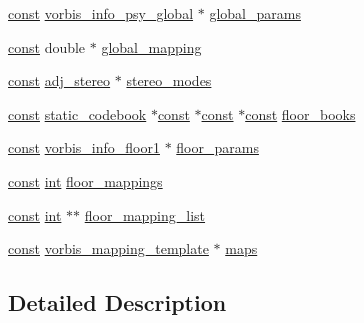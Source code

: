\begin{DoxyCompactItemize}
\item 
\hyperlink{getopt1_8c_a2c212835823e3c54a8ab6d95c652660e}{const} \hyperlink{structvorbis__info__psy__global}{vorbis\+\_\+info\+\_\+psy\+\_\+global} $\ast$ \hyperlink{structve__setup__data__template_af87eefec058f48e5772e249923a11b22}{global\+\_\+params}
\item 
\hyperlink{getopt1_8c_a2c212835823e3c54a8ab6d95c652660e}{const} double $\ast$ \hyperlink{structve__setup__data__template_a19f141e94bc9fcdf1043e2ec1be15a4c}{global\+\_\+mapping}
\item 
\hyperlink{getopt1_8c_a2c212835823e3c54a8ab6d95c652660e}{const} \hyperlink{structadj__stereo}{adj\+\_\+stereo} $\ast$ \hyperlink{structve__setup__data__template_a70fda50f0f12a99eb1149f6ff3f4ae12}{stereo\+\_\+modes}
\item 
\hyperlink{getopt1_8c_a2c212835823e3c54a8ab6d95c652660e}{const} \hyperlink{structstatic__codebook}{static\+\_\+codebook} $\ast$\hyperlink{getopt1_8c_a2c212835823e3c54a8ab6d95c652660e}{const} $\ast$\hyperlink{getopt1_8c_a2c212835823e3c54a8ab6d95c652660e}{const} $\ast$\hyperlink{getopt1_8c_a2c212835823e3c54a8ab6d95c652660e}{const} \hyperlink{structve__setup__data__template_acdb6d67e5637a4c75a43ec70edc80d56}{floor\+\_\+books}
\item 
\hyperlink{getopt1_8c_a2c212835823e3c54a8ab6d95c652660e}{const} \hyperlink{structvorbis__info__floor1}{vorbis\+\_\+info\+\_\+floor1} $\ast$ \hyperlink{structve__setup__data__template_aad9d08b4c6963f216ab062c84c033ed1}{floor\+\_\+params}
\item 
\hyperlink{getopt1_8c_a2c212835823e3c54a8ab6d95c652660e}{const} \hyperlink{xmltok_8h_a5a0d4a5641ce434f1d23533f2b2e6653}{int} \hyperlink{structve__setup__data__template_aeef323dc0bb8a405c9a0eba0e41b6453}{floor\+\_\+mappings}
\item 
\hyperlink{getopt1_8c_a2c212835823e3c54a8ab6d95c652660e}{const} \hyperlink{xmltok_8h_a5a0d4a5641ce434f1d23533f2b2e6653}{int} $\ast$$\ast$ \hyperlink{structve__setup__data__template_a3251bd75c47300d53a68cdab42052df6}{floor\+\_\+mapping\+\_\+list}
\item 
\hyperlink{getopt1_8c_a2c212835823e3c54a8ab6d95c652660e}{const} \hyperlink{structvorbis__mapping__template}{vorbis\+\_\+mapping\+\_\+template} $\ast$ \hyperlink{structve__setup__data__template_ac7dcf3e49171d4960559c4cb32d08786}{maps}
\end{DoxyCompactItemize}


\subsection{Detailed Description}



